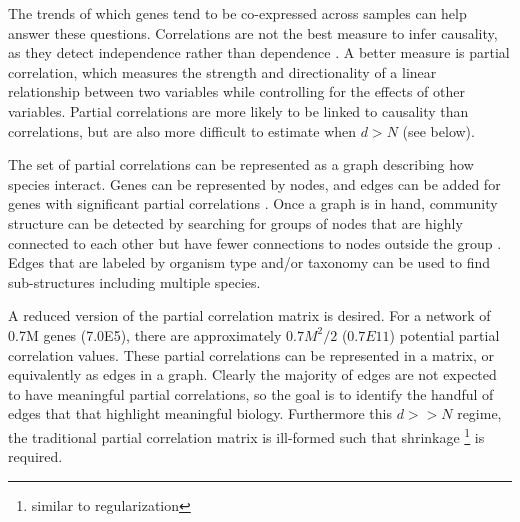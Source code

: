 The trends of which genes tend to be co-expressed across samples can help answer these questions.
Correlations are not the best measure to infer causality, as they detect independence rather than dependence \cite{schafer2005}.
A better measure is partial correlation, which measures the strength and directionality of a linear relationship between two variables while controlling for the effects of other variables.
Partial correlations are more likely to be linked to causality than correlations, but are also more difficult to estimate when $d > N$ (see below). %

The set of partial correlations can be represented as a graph describing how species interact.
Genes can be represented by nodes, and edges can be added for genes with significant partial correlations \cite{borthagaray2014}.
Once a graph is in hand, community structure can be detected by searching for groups of nodes that are highly connected to each other but have fewer connections to nodes outside the group \cite{hero2012}.
Edges that are labeled by organism type and/or taxonomy can be used to find sub-structures including multiple species.

A reduced version of the partial correlation matrix is desired.
For a network of 0.7M genes (7.0E5), there are approximately 0$.7M^2/2$ ($0.7E11$) potential partial correlation values. %
These partial correlations can be represented in a matrix, or equivalently as edges in a graph.
Clearly the majority of edges are not expected to have meaningful partial correlations, so the goal is to identify the handful of edges that that highlight meaningful biology.
Furthermore this $d >> N$ regime, the traditional partial correlation matrix is ill-formed \cite{whittaker2009} such that shrinkage \footnote{similar to regularization} is required.

